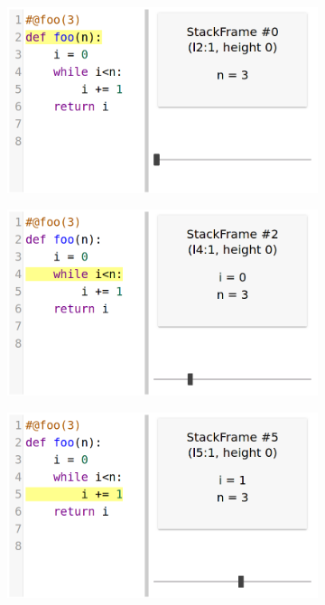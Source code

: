 \documentclass[english,submission]{programming}
\begin{document}
\begin{figure}[htbp]
  \centering
  \begin{subfigure}[b]{0.45\textwidth}
      \centering
      \includegraphics[width=\textwidth]{img/demo/stack/0.png}
  \end{subfigure}
  \hfill
  \begin{subfigure}[b]{0.45\textwidth}
    \centering
    \includegraphics[width=\textwidth]{img/demo/stack/1.png}
  \end{subfigure}
  \vfill
  \par\bigskip
  \begin{subfigure}[b]{0.45\textwidth}
    \centering
    \includegraphics[width=\textwidth]{img/demo/stack/2.png}

\end{subfigure}
\end{figure}
\end{document}
